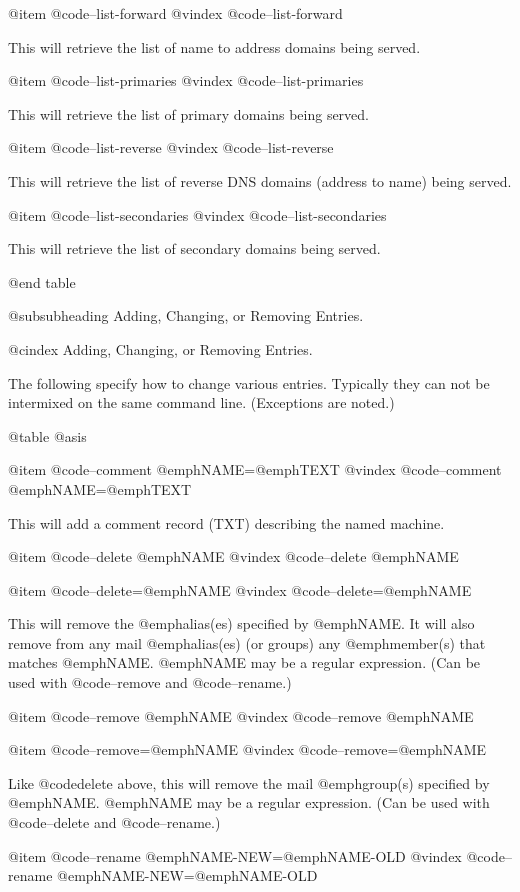 @item @code{--list-forward}
@vindex @code{--list-forward}

This will retrieve the list of name to address domains being served.

@item @code{--list-primaries}
@vindex @code{--list-primaries}

This will retrieve the list of primary domains being served.

@item @code{--list-reverse}
@vindex @code{--list-reverse}

This will retrieve the list of reverse DNS domains (address to name) being
served.

@item @code{--list-secondaries}
@vindex @code{--list-secondaries}

This will retrieve the list of secondary domains being served.

@end table

@subsubheading Adding, Changing, or Removing Entries.

@cindex Adding, Changing, or Removing Entries.

The following specify how to change various entries.  Typically they can not be
intermixed on the same command line.  (Exceptions are noted.)

@table @asis

@item @code{--comment }@emph{NAME}=@emph{TEXT}
@vindex @code{--comment }@emph{NAME}=@emph{TEXT}

This will add a comment record (TXT) describing the named machine.

@item @code{--delete }@emph{NAME}
@vindex @code{--delete }@emph{NAME}

@item @code{--delete=}@emph{NAME}
@vindex @code{--delete=}@emph{NAME}

This will remove the @emph{alias}(es) specified by @emph{NAME}.  It will also remove
from any mail @emph{alias}(es) (or groups) any @emph{member}(s) that matches @emph{NAME}.  @emph{NAME}
may be a regular expression.  (Can be used with @code{--remove} and @code{--rename}.)

@item @code{--remove }@emph{NAME}
@vindex @code{--remove }@emph{NAME}

@item @code{--remove=}@emph{NAME}
@vindex @code{--remove=}@emph{NAME}

Like @code{delete} above, this will remove the mail @emph{group}(s) specified by @emph{NAME}.
@emph{NAME} may be a regular expression.  (Can be used with @code{--delete} and
@code{--rename}.)

@item @code{--rename} @emph{NAME-NEW}=@emph{NAME-OLD}
@vindex @code{--rename} @emph{NAME-NEW}=@emph{NAME-OLD}

